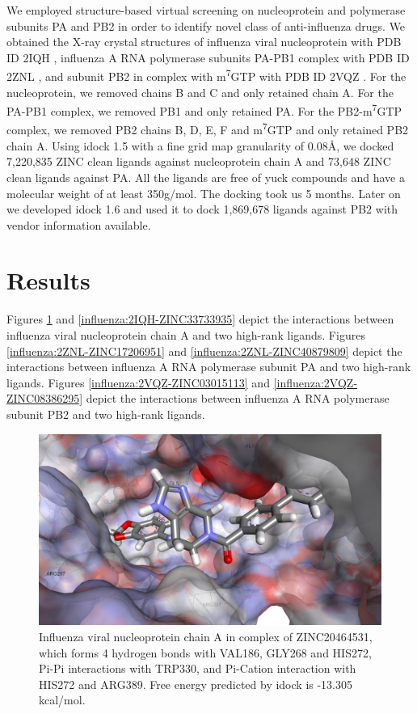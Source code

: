 We employed structure-based virtual screening on nucleoprotein and polymerase subunits PA and PB2 in order to identify novel class of anti-influenza drugs. We obtained the X-ray crystal structures of influenza viral nucleoprotein with PDB ID 2IQH \citep{1140}, influenza A RNA polymerase subunits PA-PB1 complex with PDB ID 2ZNL \citep{1141}, and subunit PB2 in complex with m\textsuperscript{7}GTP with PDB ID 2VQZ \citep{1192}. For the nucleoprotein, we removed chains B and C and only retained chain A. For the PA-PB1 complex, we removed PB1 and only retained PA. For the PB2-m\textsuperscript{7}GTP complex, we removed PB2 chains B, D, E, F and m\textsuperscript{7}GTP and only retained PB2 chain A. Using idock 1.5 with a fine grid map granularity of 0.08\AA, we docked 7,220,835 ZINC \citep{532} clean ligands against nucleoprotein chain A and 73,648 ZINC clean ligands against PA. All the ligands are free of yuck compounds and have a molecular weight of at least 350g/mol. The docking took us 5 months. Later on we developed idock 1.6 and used it to dock 1,869,678 ligands against PB2 with vendor information available.

\section{Results}

Figures \ref{influenza:2IQH-ZINC20464531} and \ref{influenza:2IQH-ZINC33733935} depict the interactions between influenza viral nucleoprotein chain A and two high-rank ligands. Figures \ref{influenza:2ZNL-ZINC17206951} and \ref{influenza:2ZNL-ZINC40879809} depict the interactions between influenza A RNA polymerase subunit PA and two high-rank ligands. Figures \ref{influenza:2VQZ-ZINC03015113} and \ref{influenza:2VQZ-ZINC08386295} depict the interactions between influenza A RNA polymerase subunit PB2 and two high-rank ligands.

\begin{figure}
\centering
\includegraphics[width=\linewidth]{../influenza/2IQH-ZINC20464531.png}
\caption{Influenza viral nucleoprotein chain A in complex of ZINC20464531, which forms 4 hydrogen bonds with VAL186, GLY268 and HIS272, Pi-Pi interactions with TRP330, and Pi-Cation interaction with HIS272 and ARG389. Free energy predicted by idock is -13.305 kcal/mol.}
\label{influenza:2IQH-ZINC20464531}
\end{figure}

